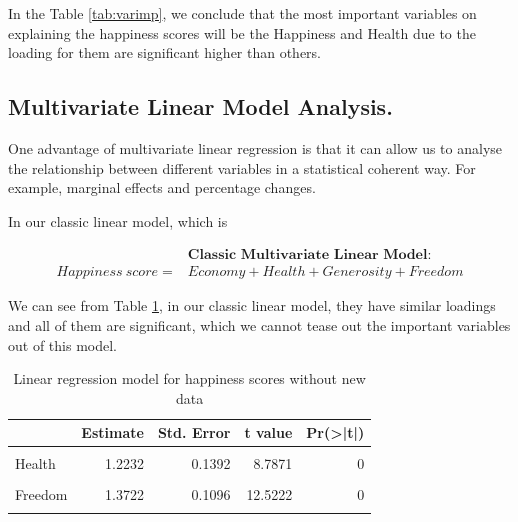 \documentclass[11pt,a4paper,]{article}
\begin{document}
In the Table \ref{tab:varimp}, we conclude that the most important variables on explaining the happiness scores will be the Happiness and Health due to the loading for them are significant higher than others.

\newpage

\hypertarget{multivariate-linear-model-analysis.}{%
\subsection{Multivariate Linear Model Analysis.}\label{multivariate-linear-model-analysis.}}

One advantage of multivariate linear regression is that it can allow us to analyse the relationship between different variables in a statistical coherent way. For example, marginal effects and percentage changes.

In our classic linear model, which is

\[
\begin{aligned}
&\textbf{Classic Multivariate Linear Model}:\\
Happiness\ score=& Economy+Health+Generosity+Freedom
\end{aligned}
\]

We can see from Table \ref{tab:without}, in our classic linear model, they have similar loadings and all of them are significant, which we cannot tease out the important variables out of this model.

\begin{table}

\caption{\label{tab:without}Linear regression model for happiness scores without new data}
\centering
\begin{tabular}[t]{l|r|r|r|r}
\hline
  & Estimate & Std. Error & t value & Pr(>|t|)\\
\hline
\cellcolor{gray!6}{(Intercept)} & \cellcolor{gray!6}{2.4374} & \cellcolor{gray!6}{0.0753} & \cellcolor{gray!6}{32.3704} & \cellcolor{gray!6}{0}\\
\hline
Health & 1.2232 & 0.1392 & 8.7871 & 0\\
\hline
\cellcolor{gray!6}{Economy} & \cellcolor{gray!6}{1.4543} & \cellcolor{gray!6}{0.0842} & \cellcolor{gray!6}{17.2820} & \cellcolor{gray!6}{0}\\
\hline
Freedom & 1.3722 & 0.1096 & 12.5222 & 0\\
\hline
\cellcolor{gray!6}{Generosity} & \cellcolor{gray!6}{1.1702} & \cellcolor{gray!6}{0.1397} & \cellcolor{gray!6}{8.3785} & \cellcolor{gray!6}{0}\\
\hline
\end{tabular}
\end{table}
\end{document}
